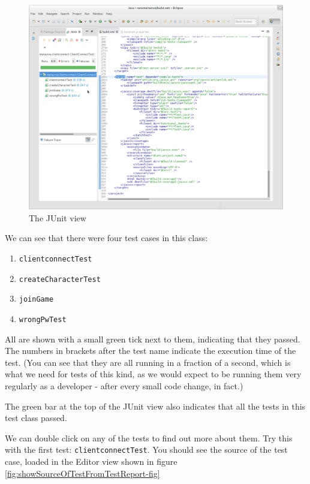 \documentclass[
]{book}
\providecommand{\tightlist}{%
  \setlength{\itemsep}{0pt}\setlength{\parskip}{0pt}}
\begin{document}
\begin{figure}

{\centering \includegraphics[width=1\linewidth]{images/3.2.4showTestResultsForClientCoverage} 

}

\caption{The JUnit view}\label{fig:showTestResultsForClientCoverage-fig}
\end{figure}

We can see that there were four test cases in this class:

\begin{enumerate}
\def\labelenumi{\arabic{enumi}.}
\tightlist
\item
  \texttt{clientconnectTest}
\item
  \texttt{createCharacterTest}
\item
  \texttt{joinGame}
\item
  \texttt{wrongPwTest}
\end{enumerate}

All are shown with a small green tick next to them, indicating that they passed. The numbers in brackets after the test name indicate the execution time of the test. (You can see that they are all running in a fraction of a second, which is what we need for tests of this kind, as we would expect to be running them very regularly as a developer - after every small code change, in fact.)

The green bar at the top of the JUnit view also indicates that all the tests in this test class passed.

We can double click on any of the tests to find out more about them. Try this with the first test: \texttt{clientconnectTest}. You should see the source of the test case, loaded in the Editor view shown in figure \ref{fig:showSourceOfTestFromTestReport-fig}
\end{document}
